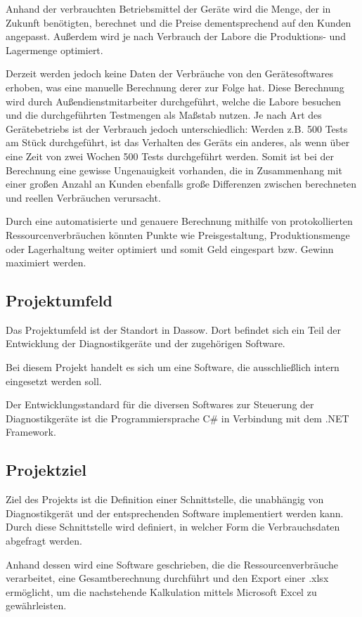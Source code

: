 Anhand der verbrauchten Betriebsmittel der Geräte wird die Menge, der in Zukunft benötigten, berechnet und die Preise dementsprechend auf den Kunden angepasst. Außerdem wird je nach Verbrauch der Labore die Produktions- und Lagermenge optimiert.

Derzeit werden jedoch keine Daten der Verbräuche von den Gerätesoftwares erhoben, was eine manuelle Berechnung derer zur Folge hat. Diese Berechnung wird durch Außendienstmitarbeiter durchgeführt, welche die Labore besuchen und die durchgeführten Testmengen als Maßstab nutzen. Je nach Art des Gerätebetriebs ist der Verbrauch jedoch unterschiedlich: Werden z.B. 500 Tests am Stück durchgeführt, ist das Verhalten des Geräts ein anderes, als wenn über eine Zeit von zwei Wochen 500 Tests durchgeführt werden. Somit ist bei der Berechnung eine gewisse Ungenauigkeit vorhanden, die in Zusammenhang mit einer großen Anzahl an Kunden ebenfalls große Differenzen zwischen berechneten und reellen Verbräuchen verursacht. 

Durch eine automatisierte und genauere Berechnung mithilfe von protokollierten Ressourcenverbräuchen könnten Punkte wie Preisgestaltung, Produktionsmenge oder Lagerhaltung weiter optimiert und somit Geld eingespart bzw. Gewinn maximiert werden.

\subsection{Projektumfeld}
\label{sec:Projektumfeld}
Das Projektumfeld ist der {\betriebNameKzf} Standort in Dassow. Dort befindet sich ein Teil der Entwicklung der Diagnostikgeräte und der zugehörigen Software. 

Bei diesem Projekt handelt es sich um eine Software, die ausschließlich intern eingesetzt werden soll.

Der Entwicklungsstandard für die diversen Softwares zur Steuerung der Diagnostikgeräte ist die Programmiersprache C\# in Verbindung mit dem .NET Framework.

\subsection{Projektziel}
\label{sec:Projektziel}
Ziel des Projekts ist die Definition einer Schnittstelle, die unabhängig von Diagnostikgerät und der entsprechenden Software implementiert werden kann. Durch diese Schnittstelle wird definiert, in welcher Form die Verbrauchsdaten abgefragt werden.

Anhand dessen wird eine Software geschrieben, die die Ressourcenverbräuche verarbeitet, eine Gesamtberechnung durchführt und den Export einer \glqq .xlsx\grqq \xspace ermöglicht, um die nachstehende Kalkulation mittels Microsoft Excel zu gewährleisten.


